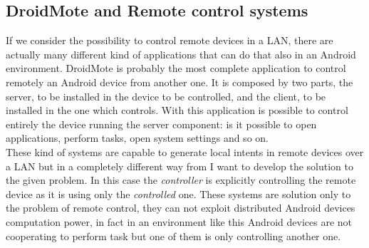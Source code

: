 \subsection{DroidMote and Remote control systems }
If we consider the possibility to control remote devices in a LAN, there are actually many different kind of applications that can do that also in an Android environment.
DroidMote is probably the most complete application to control remotely an Android device from another one. It is composed by two parts, the server, to be installed in the device to be controlled, and the client, to be installed in the one which controls. With this application is possible to control entirely the device running the server component: is it possible to open applications, perform tasks, open system settings and so on.\\
These kind of systems are capable to generate local intents in remote devices over a LAN but in a completely different way from I want to develop the solution to the given problem. In this case the \textit{controller} is explicitly controlling the remote device as it is using only the \textit{controlled} one. These systems are solution only to the problem of remote control, they can not exploit distributed Android devices computation power, in fact in an environment like this Android devices are not cooperating to perform task but one of them is only controlling another one.
